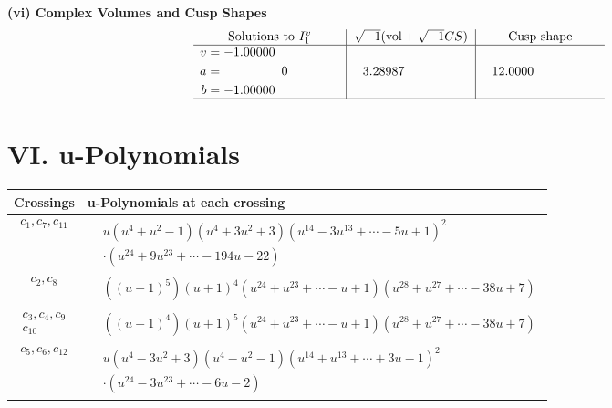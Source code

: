 \documentclass[1p]{elsarticle_modified}
\theoremstyle{definition}
\newcommand{\I}{\sqrt{-1}}
\begin{document}
\newpage\flushleft \textbf{(vi) Complex Volumes and Cusp Shapes}
$$\begin{array}{c|c|c}  
\text{Solutions to }I^v_{1}& \I (\text{vol} + \sqrt{-1}CS) & \text{Cusp shape}\\
 \hline 
\begin{aligned}
v &= -1.00000\phantom{ +0.000000I} \\
a &= \phantom{-0.000000 } 0 \\
b &= -1.00000\phantom{ +0.000000I}\end{aligned}
 & \phantom{-}3.28987\phantom{ +0.000000I} & \phantom{-}12.0000\phantom{ +0.000000I}\\
 \hline 
 \end{array}$$\newpage
\newpage\renewcommand{\arraystretch}{1}
\centering \section*{ VI. u-Polynomials}
\begin{tabular}{m{50pt}|m{274pt}}
Crossings & \hspace{64pt}u-Polynomials at each crossing \\
\hline $$\begin{aligned}c_{1},c_{7},c_{11}\end{aligned}$$&$\begin{aligned}
&u(u^4+u^2-1)(u^4+3 u^2+3)(u^{14}-3 u^{13}+\cdots-5 u+1)^{2}\\
&\cdot(u^{24}+9 u^{23}+\cdots-194 u-22)
\end{aligned}$\\
\hline $$\begin{aligned}c_{2},c_{8}\end{aligned}$$&$\begin{aligned}
&((u-1)^5)(u+1)^4(u^{24}+u^{23}+\cdots- u+1)(u^{28}+u^{27}+\cdots-38 u+7)
\end{aligned}$\\
\hline $$\begin{aligned}c_{3},c_{4},c_{9}\\c_{10}\end{aligned}$$&$\begin{aligned}
&((u-1)^4)(u+1)^5(u^{24}+u^{23}+\cdots- u+1)(u^{28}+u^{27}+\cdots-38 u+7)
\end{aligned}$\\
\hline $$\begin{aligned}c_{5},c_{6},c_{12}\end{aligned}$$&$\begin{aligned}
&u(u^4-3 u^2+3)(u^4- u^2-1)(u^{14}+u^{13}+\cdots+3 u-1)^{2}\\
&\cdot(u^{24}-3 u^{23}+\cdots-6 u-2)
\end{aligned}$\\
\hline
\end{tabular}\newpage\renewcommand{\arraystretch}{1}
\end{document}
